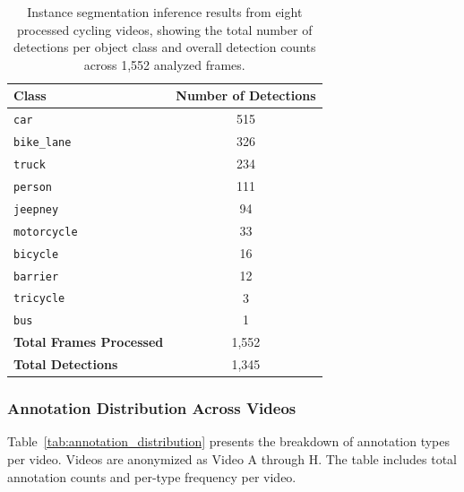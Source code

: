 \begin{table}[H]
\centering
\begin{tabular}{|l|c|}
\hline
\textbf{Class} & \textbf{Number of Detections} \\
\hline
\texttt{car}         & 515 \\
\texttt{bike\_lane}  & 326 \\
\texttt{truck}       & 234 \\
\texttt{person}      & 111  \\
\texttt{jeepney}     & 94 \\
\texttt{motorcycle}     & 33 \\
\texttt{bicycle}    & 16 \\
\texttt{barrier}     & 12 \\
\texttt{tricycle}    & 3 \\
\texttt{bus}         & 1 \\
\hline
\textbf{Total Frames Processed} & 1,552 \\
\textbf{Total Detections}       & 1,345 \\
\hline
\end{tabular}
\caption{Instance segmentation inference results from eight processed cycling videos, showing the total number of detections per object class and overall detection counts across 1,552 analyzed frames.}
\label{tab:inference_stats}
\end{table}

\subsubsection*{Annotation Distribution Across Videos}
Table~\ref{tab:annotation_distribution} presents the breakdown of annotation types per video. Videos are anonymized as Video A through H. The table includes total annotation counts and per-type frequency per video.

